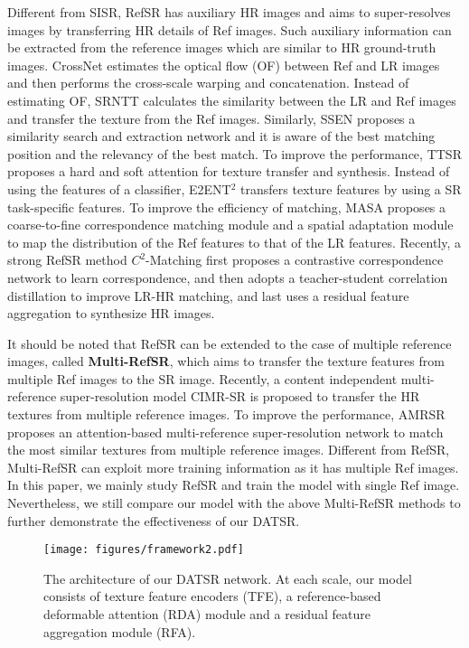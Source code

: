 \documentclass[runningheads]{llncs}
\begin{document}
Different from SISR, RefSR has auxiliary HR images and aims to super-resolves images by transferring HR details of Ref images.
Such auxiliary information can be extracted from the reference images which are similar to HR ground-truth images.
CrossNet \cite{zheng2018crossnet} estimates the optical flow (OF) between Ref and LR images and then performs the cross-scale warping and concatenation.
Instead of estimating OF, SRNTT \cite{zhang2019image} calculates the similarity between the LR and Ref images and transfer the texture from the Ref images.
Similarly, SSEN \cite{Shim_2020_CVPR} proposes a similarity search and extraction network and it is aware of the best matching position and the relevancy of the best match.
To improve the performance, TTSR \cite{yang2020learning} proposes a hard and soft attention for texture transfer and synthesis.
Instead of using the features of a classifier, E2ENT$^2$ \cite{xie2020feature} transfers texture features by using a SR task-specific features. 
To improve the efficiency of matching, MASA \cite{lu2021masa} proposes a coarse-to-fine correspondence matching module and a spatial adaptation module to map the distribution of the Ref features to that of the LR features. 
Recently, a strong RefSR method $C^2$-Matching \cite{jiang2021robust} first proposes a contrastive correspondence network to learn correspondence, and then adopts a teacher-student correlation distillation to improve LR-HR matching, and last uses a residual feature aggregation to synthesize HR images.

It should be noted that RefSR can be extended to the case of multiple reference images, called \textbf{Multi-RefSR}, which aims to transfer the texture features from multiple Ref images to the SR image. 
Recently, a content independent multi-reference super-resolution model CIMR-SR \cite{yantowards} is proposed to transfer the HR textures from multiple reference images.
To improve the performance, AMRSR \cite{pesavento2021attention} proposes an attention-based multi-reference super-resolution network to match the most similar textures from multiple reference images.
Different from RefSR, Multi-RefSR can exploit more training information as it has multiple Ref images.
In this paper, we mainly study RefSR and train the model with single Ref image.
Nevertheless, we still compare our model with the above Multi-RefSR methods to further demonstrate the effectiveness of our DATSR.

\begin{figure*}[t]
\setlength\belowcaptionskip{-5pt}
\centering
\texttt{[image: figures/framework2.pdf]}
\caption{The architecture of our DATSR network. At each scale, our model consists of texture feature encoders (TFE), a reference-based deformable attention (RDA) module and a residual feature aggregation module (RFA). }
\label{fig:framework}
\end{figure*}
\end{document}
